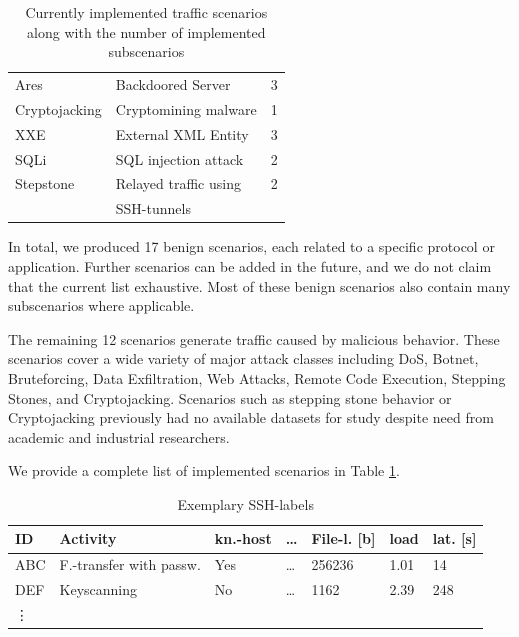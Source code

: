 \documentclass[runningheads]{llncs}
\begin{document}
\begin{table}
\begin{tabular}[t]{l|l|r}
 Ares & Backdoored Server & 3\\
 Cryptojacking & Cryptomining malware & 1\\
 XXE & External XML Entity & 3\\
 SQLi & SQL injection attack & 2 \\
 Stepstone & Relayed traffic using & 2\\
 &SSH-tunnels&\\
 \hline
\end{tabular}
\vspace{0.1cm} 
\caption{Currently implemented traffic scenarios along with the number of implemented subscenarios}
\label{tab:scen}
\end{table}



In total, we produced 17 benign scenarios, each related to a specific protocol or application. Further scenarios can be added in the future, and we do not claim that the current list exhaustive. Most of these benign scenarios also contain many subscenarios where applicable.

The remaining 12 scenarios generate traffic caused by malicious behavior. These scenarios cover a wide variety of major attack classes including DoS, Botnet, Bruteforcing, Data Exfiltration, Web Attacks, Remote Code Execution, Stepping Stones, and Cryptojacking. 
Scenarios such as stepping stone behavior or Cryptojacking previously had no available datasets for study despite need from academic and industrial researchers.


We provide a complete list of implemented scenarios in Table \ref{tab:scen}.



\begin{table}[h!]
\centering
\begin{tabular}{l|l|l|l|l|l|l}
ID& Activity & kn.-host &\dots &File-l. [b]& load&lat. [s]\\ \hline
ABC & F.-transfer with passw. &Yes&\dots &256236& 1.01 & 14 \\
DEF & Keyscanning &No&\dots &1162& 2.39 & 248 \\
\vdots
\end{tabular}
\caption{Exemplary SSH-labels}\label{Tab:Labels}
\end{table}
\end{document}
